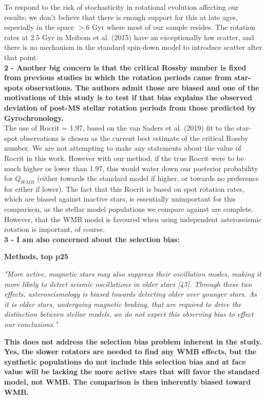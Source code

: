 \documentclass[11pt]{article}
\begin{document}
To respond to the risk of stochasticity in rotational evolution affecting our results: we don’t believe that there is enough support for this at late ages, especially in the space $> 6$ Gyr where most of our sample resides. The rotation rates at 2.5 Gyr in Meibom et al. (2015) have an exceptionally low scatter, and there is no mechanism in the standard spin-down model to introduce scatter after that point.\\

\noindent\noindent\textbf{ 2 - Another big concern is that the critical Rossby number is fixed from previous studies in which the rotation periods came from star-spots observations. The authors admit those are biased and one of the motivations of this study is to test if that bias explains the observed deviation of post-MS stellar rotation periods from those predicted by Gyrochronology.}\\

The use of Rocrit = 1.97, based on the van Saders et al. (2019) fit to the star-spot observations is chosen as the current best estimate of the critical Rossby number. We are not attempting to make any statements about the value of Rocrit in this work. However with our method, if the true Rocrit were to be much higher or lower than 1.97, this would water down our posterior probability for $Q_{WMB}$ (either towards the standard model if higher, or towards no preference for either if lower). The fact that this Rocrit is based on spot rotation rates, which are biased against inactive stars, is essentially unimportant for this comparison, as the stellar model populations we compare against are complete. However, that the WMB model is favoured when using independent asteroseismic rotation is important, of course.\\


\noindent\noindent\textbf{ 3 - I am also concerned about the selection bias:}

\noindent\textbf{Methods, top p25}

\textit{"More active, magnetic stars may also suppress their oscillation modes, making it more likely to detect seismic oscillations in older stars [45]. Through these two effects, asteroseismology is biased towards detecting older over younger stars. As it is older stars, undergoing magnetic braking, that are required to drive the distinction between stellar models, we do not expect this observing bias to effect our conclusions."}

\noindent\textbf{This does not address the selection bias problem inherent in the study.  Yes, the slower rotators are needed to find any WMB effects, but the synthetic populations do not include this selection bias and at face value will be lacking the more active stars that will favor the standard model, not WMB. The comparison is then inherently biased toward WMB.}\\
\end{document}
